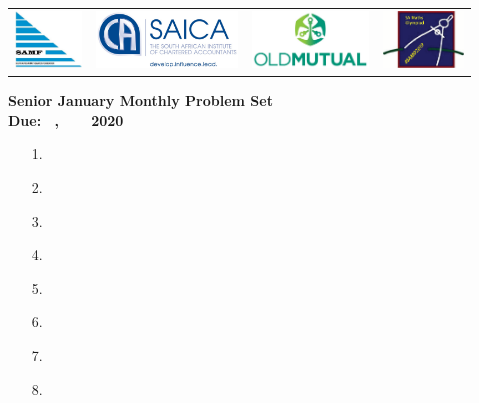 \documentclass{article}
\begin{document}
\setlength{\tabcolsep}{5pt}
\begin{center} \begin{tabular}{cccc}
	\includegraphics[height=43pt]{SAMF_logo.jpg} &
	\includegraphics[height=43pt]{SAICA_logo.jpg} &
	\includegraphics[height=43pt]{OM_Logo_Stacked_Vignette_on_White_RGB.jpg} &
	\includegraphics[height=43pt]{SAMO2019.png}
\end{tabular} \end{center}

\bigskip

\begin{center}
\textbf{\Large Senior January Monthly Problem Set}
\\ \vspace{1em}
\textbf{\large Due: ~, ~ ~ 2020}
\end{center}


\begin{enumerate}

\bigskip
\item[1.] %

\medskip
\item[2.] %

\medskip
\item[3.] %

\medskip
\item[4.] %

\medskip
\item[5.] %

\medskip
\item[6.] %

\medskip
\item[7.] %

\medskip
\item[8.] %

\end{enumerate}
\end{document}
